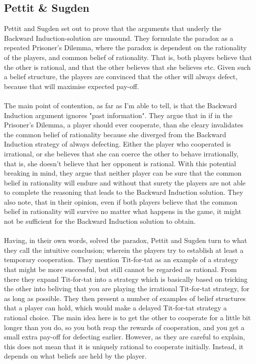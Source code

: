\documentclass{article}
\begin{document}
\subsection{Pettit \& Sugden}
Pettit and Sugden set out to prove that the arguments that underly the Backward Induction-solution are unsound. They formulate the paradox as a repeated Prisoner's Dilemma, where the paradox is dependent on the rationality of the players, and common belief of rationality. That is, both players believe that the other is rational, and that the other believes that she believes etc. Given such a belief structure, the players are convinced that the other will always defect, because that will maximise expected pay-off.
\\
\\
The main point of contention, as far as I'm able to tell, is that the Backward Induction argument ignores "past information". They argue that in if in the Prisoner's Dilemma, a player should ever cooperate, than she cleary invalidates the common belief of rationality because she diverged from the Backward Induction strategy of always defecting. Either the player who cooperated is irrational, or she believes that she can coerce the other to behave irrationally, that is, she doesn't believe that her opponent is rational. With this potential breaking in mind, they argue that neither player can be sure that the common belief in rationality will endure and without that surety the players are not able to complete the reasoning that leads to the Backward Induction solution. They also note, that in their opinion, even if both players believe that the common belief in rationality will survive no matter what happens in the game, it might not be sufficient for the Backward Induction solution to obtain.
\\
\\
Having, in their own words, solved the paradox, Pettit and Sugden turn to what they call the intuitive conclusion; wherein the players try to establish at least a temporary cooperation. They mention Tit-for-tat as an example of a strategy that might be more successful, but still cannot be regarded as rational. From there they expand Tit-for-tat into a strategy which is basically based on tricking the other into beliving that you are playing the irrational Tit-for-tat strategy, for as long as possible. They then present a number of examples of belief structures that a player can hold, which would make a delayed Tit-for-tat strategy a rational choice. The main idea here is to get the other to cooperate for a little bit longer than you do, so you both reap the rewards of cooperation, and you get a small extra pay-off for defecting earlier. However, as they are careful to explain, this does not mean that it is uniquely rational to cooperate initially. Instead, it depends on what beliefs are held by the player. 
\\
\\
\end{document}
